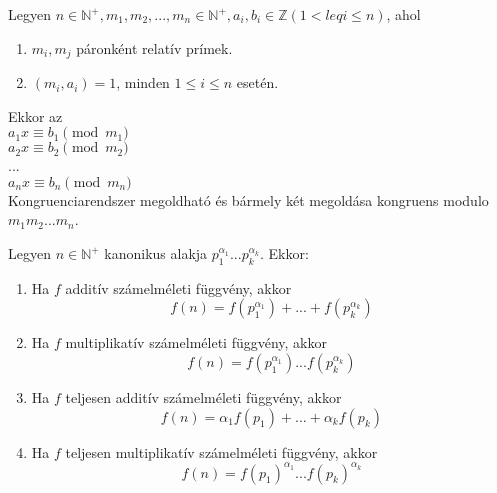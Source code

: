\documentclass{beamer}
\begin{document}
\begin{frame}
\begin{tcolorbox}[title={Tétel: Kínai maradéktétel}]
Legyen $n \in \mathbb{N}^+, m_1, m_2, ..., m_n \in \mathbb{N}^+, a_i, b_i \in \mathbb{Z} (1 <leq i \leq n)$, ahol
\begin{enumerate}
\item $m_i, m_j$ páronként relatív prímek.
\item $(m_i, a_i) = 1$, minden $1 \leq i \leq n$ esetén.
\end{enumerate}
Ekkor az\\
\bigskip
	$a_1x \equiv b_1 \pmod{m_1}$\\
	$a_2x \equiv b_2 \pmod{m_2}$\\
	...\\
	$a_nx \equiv b_n \pmod{m_n}$\\
\bigskip
Kongruenciarendszer megoldható és bármely két megoldása kongruens modulo $m_1m_2...m_n$.
\end{tcolorbox}

\begin{tcolorbox}[title={Def.: A kínai maradéktétel megoldása}]
\end{tcolorbox}
\end{frame}

\begin{frame}

\begin{tcolorbox}[title={Def.: A számelméleti függvények}]
\end{tcolorbox}
\begin{tcolorbox}[title={Tétel: Számelméleti függvények}]
Legyen $n \in \mathbb{N}^+$ kanonikus alakja $p_1^{{\alpha}_1}...p_k^{{\alpha}_k}$. Ekkor:\\
\begin{enumerate}
\item Ha $f$ additív számelméleti függvény, akkor $$f(n) = f(p_1^{{\alpha}_1}) + ... + f(p_k^{{\alpha}_k})$$
\item Ha $f$ multiplikatív számelméleti függvény, akkor $$f(n) = f(p_1^{{\alpha}_1})...f(p_k^{{\alpha}_k})$$
\item Ha $f$ teljesen additív számelméleti függvény, akkor $$f(n) = {\alpha}_1f(p_1) + ... + {\alpha}_kf(p_k)$$
\item Ha $f$ teljesen multiplikatív számelméleti függvény, akkor $$f(n) = f(p_1)^{{\alpha}_1}...f(p_k)^{{\alpha}_k}$$
\end{enumerate}
\end{tcolorbox}
\end{frame}
\end{document}
